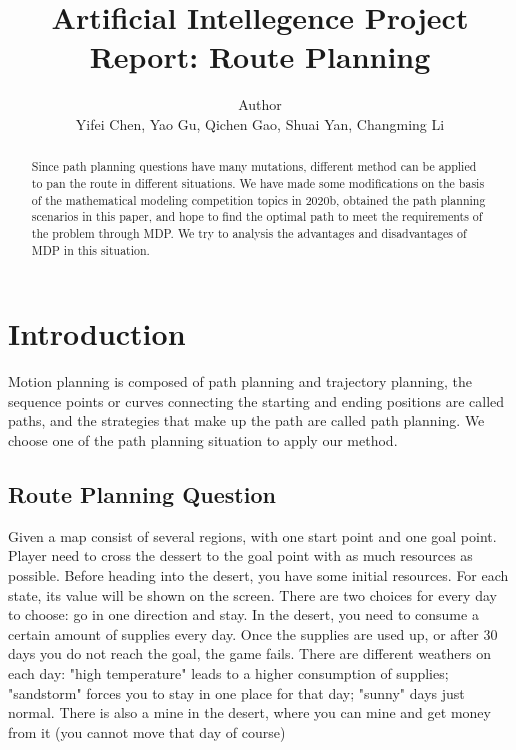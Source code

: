 \documentclass[10pt,twocolumn,letterpaper]{article}
\begin{document}
\title{Artificial Intellegence Project Report: Route Planning}

\author{Author\\
Yifei Chen, Yao Gu, Qichen Gao, Shuai Yan, Changming Li}


\maketitle

\begin{abstract}
   Since path planning questions have many mutations, different method can be applied to pan the route in different situations. 
   We have made some modifications on the basis of the mathematical modeling competition topics in 2020b, 
   obtained the path planning scenarios in this paper, and hope to find the optimal path to meet the requirements 
   of the problem through MDP. 
   We try to analysis the advantages and disadvantages of MDP in this situation.

\end{abstract}

\section{Introduction}

Motion planning is composed of path planning and trajectory planning,
 the sequence points or curves connecting the starting and ending 
 positions are called paths, and the strategies that make up the 
 path are called path planning. We choose one of the path planning 
 situation to apply our method.

\subsection{Route Planning Question}

Given a map consist of several regions, with one start point and 
one goal point. Player need to cross the dessert to the goal point 
with as much resources as possible. Before heading into the desert, 
you have some initial resources. For each state, its value will be shown 
on the screen. There are two choices for every day to choose: go in one 
direction and stay. In the desert, you need to consume a certain amount 
of supplies every day. Once the supplies are used up, or after 30 days 
you do not reach the goal, the game fails. There are different 
weathers on each day: "high temperature" leads to a higher consumption 
of supplies; "sandstorm" forces you to stay in one place for that 
day; "sunny" days just normal. There is also a mine in the desert, 
where you can mine and get money from it (you cannot move that day of course)
\end{document}
